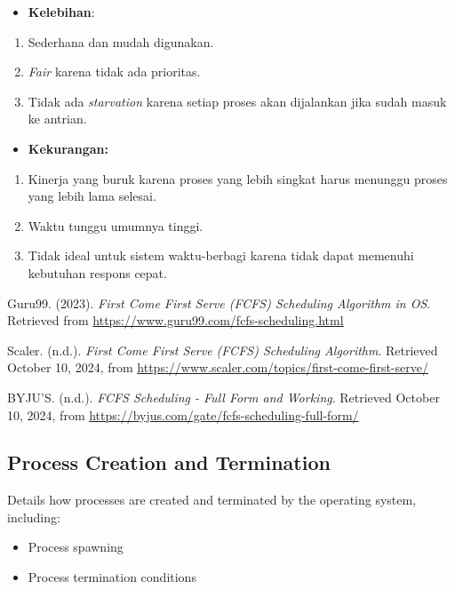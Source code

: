 \documentclass[12pt]{article}
\begin{document}
\begin{itemize}
    \item \textbf{Kelebihan}:
\end{itemize}

\begin{enumerate}
    \item Sederhana dan mudah digunakan.
    \item \textit{Fair} karena tidak ada prioritas.
    \item Tidak ada \textit{starvation} karena setiap proses akan dijalankan jika sudah masuk ke antrian.
\end{enumerate}


\begin{itemize}
    \item \textbf{Kekurangan:}
\end{itemize}

\begin{enumerate}
    \item Kinerja yang buruk karena proses yang lebih singkat harus menunggu proses yang lebih lama selesai.
    \item Waktu tunggu umumnya tinggi.
    \item Tidak ideal untuk sistem waktu-berbagi karena tidak dapat memenuhi kebutuhan respons cepat.
\end{enumerate}

\renewcommand{\refname}{Sumber}
\begin{thebibliography}{}

Guru99. (2023). \textit{First Come First Serve (FCFS) Scheduling Algorithm in OS}. Retrieved from \url{https://www.guru99.com/fcfs-scheduling.html}

Scaler. (n.d.). \textit{First Come First Serve (FCFS) Scheduling Algorithm}. Retrieved October 10, 2024, from \url{https://www.scaler.com/topics/first-come-first-serve/}

BYJU'S. (n.d.). \textit{FCFS Scheduling - Full Form and Working}. Retrieved October 10, 2024, from \url{https://byjus.com/gate/fcfs-scheduling-full-form/}

\end{thebibliography}

\subsection{Process Creation and Termination}
Details how processes are created and terminated by the operating system, including:
\begin{itemize}
    \item Process spawning
    \item Process termination conditions
\end{itemize}
\end{document}
